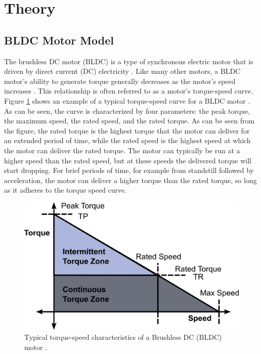 \section{Theory}

\subsection{BLDC Motor Model}
    \label{sec:bldc_theory}

    The brushless DC motor (BLDC) is a type of synchronous electric motor that is driven by direct current (DC) electricity \cite{PMSM_BOOK}. Like many other motors, a BLDC motor's ability to generate torque generally decreases as the motor's speed increases \cite{Microchip_BLDC}. This relationship is often referred to as a motor's torque-speed curve. Figure \ref{fig:bldc_torque_speed} shows an example of a typical torque-speed curve for a BLDC motor \cite{Microchip_BLDC}. As can be seen, the curve is characterized by four parameters: the peak torque, the maximum speed, the rated speed, and the rated torque. As can be seen from the figure, the rated torque is the highest torque that the motor can deliver for an extended period of time, while the rated speed is the highest speed at which the motor can deliver the rated torque. The motor can typically be run at a higher speed than the rated speed, but at these speeds the delivered torque will start dropping. For brief periods of time, for example from standstill followed by acceleration, the motor can deliver a higher torque than the rated torque, so long as it adheres to the torque speed curve. 

    \begin{figure}[H]
        \centering
        \includegraphics[width=\textwidth]{Images/torque_speed_own.png}
        \caption{Typical torque-speed characteristics of a Brushless DC (BLDC) motor \cite{Microchip_BLDC}. }
        \label{fig:bldc_torque_speed}
    \end{figure}


